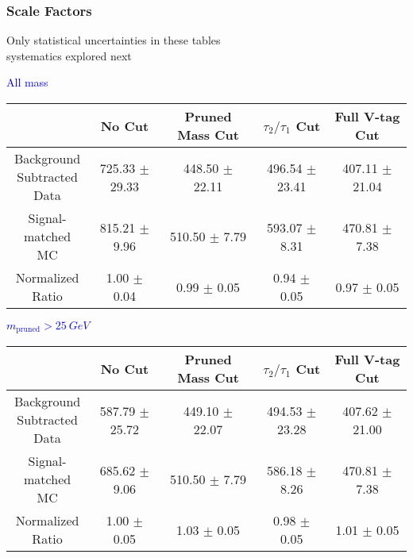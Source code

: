 \documentclass{beamer}
\begin{document}
\begin{frame}
  \frametitle{Scale Factors}
  Only statistical uncertainties in these tables \\ systematics explored next
  \begin{adjustwidth}{-1.5em}{-1.5em}
    \centering
    \vspace{6pt}
    \textcolor{blue}{All mass}
    \vspace{6pt}

    {\scriptsize
      \begin{tabular}{c | c | c | c | c}
        \hline
        & No Cut & Pruned Mass Cut & $\tau_2/\tau_1$ Cut & Full V-tag Cut \\
        \hline
        \makecell{Background \\ Subtracted \\ Data} & 725.33 $\pm$ 29.33 & 448.50 $\pm$ 22.11 & 496.54 $\pm$ 23.41 & 407.11 $\pm$ 21.04 \\
        \makecell{Signal-\\ matched MC} & 815.21 $\pm$ 9.96 & 510.50 $\pm$ 7.79 & 593.07 $\pm$ 8.31 & 470.81 $\pm$ 7.38 \\
        \hline
        \makecell{Normalized \\ Ratio} & 1.00 $\pm$ 0.04 & 0.99 $\pm$ 0.05 & 0.94 $\pm$ 0.05 & 0.97 $\pm$ 0.05 \\
        \hline
      \end{tabular}
    }

    \vspace{6pt}
    \textcolor{blue}{$m_\text{pruned} > \SI{25}{GeV}$}
    \vspace{6pt}

    {\scriptsize
      \begin{tabular}{c | c | c | c | c}
        \hline
        & No Cut & Pruned Mass Cut & $\tau_2/\tau_1$ Cut & Full V-tag Cut \\
        \hline
        \makecell{Background \\ Subtracted \\ Data} & 587.79 $\pm$ 25.72 & 449.10 $\pm$ 22.07 & 494.53 $\pm$ 23.28 & 407.62 $\pm$ 21.00 \\
        \makecell{Signal-\\ matched MC} & 685.62 $\pm$ 9.06 & 510.50 $\pm$ 7.79 & 586.18 $\pm$ 8.26 & 470.81 $\pm$ 7.38 \\
        \hline
        \makecell{Normalized \\ Ratio} & 1.00 $\pm$ 0.05 & 1.03 $\pm$ 0.05 & 0.98 $\pm$ 0.05 & 1.01 $\pm$ 0.05 \\
        \hline
      \end{tabular}
    }
  \end{adjustwidth}
\end{frame}
\end{document}
